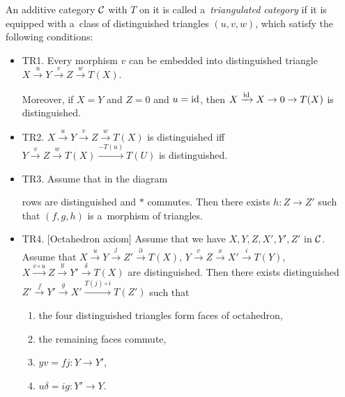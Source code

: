 	\begin{definition}
		An additive category $\mathcal{C}$ with $T$ on it is called
		a~{\em triangulated category} if it is equipped
		with a~class of distinguished triangles $(u,v,w)$,
		which satisfy the following conditions:
		\begin{itemize}
			\item TR1. Every morphism $v$ can be embedded into 
			distinguished triangle 
			$X \xrightarrow u Y \xrightarrow v Z \xrightarrow w T(X)$.
			
			Moreover, if $X=Y$ and $Z=0$ and $u={\mathrm{id}}$, then
			$X \xrightarrow{{\mathrm{id}}} X \to 0 \to T(X)$
			is distinguished.
			
			\item TR2. $X \xrightarrow u Y \xrightarrow v Z \xrightarrow w T(X)$
			is distinguished iff
			$Y \xrightarrow v Z \xrightarrow w T(X) \xrightarrow{-T(u)} T(U)$
			is distinguished.
			
			\item TR3. Assume that in the diagram
			
			rows are distinguished and $\ast$ commutes.
			Then there exists $h:Z \to Z'$ such that $(f,g,h)$
			is a~morphism of triangles.
			
			\item TR4. [Octahedron axiom]
			Assume that we have $X,Y,Z,X',Y',Z'$ in $\mathcal{C}$.
			Assume that 
			$X \xrightarrow u Y \xrightarrow j Z' \xrightarrow \partial T(X)$,
			$Y \xrightarrow v Z \xrightarrow x X' \xrightarrow i T(Y)$,
			$X \xrightarrow {v \circ u} Z \xrightarrow y Y' \xrightarrow \delta T(X)$
			are distinguished.
			Then there exists distinguished
			$Z' \xrightarrow f Y' \xrightarrow g X' \xrightarrow {T(j) \circ i} T(Z')$
			such that
			\begin{enumerate}
				\item the four distinguished triangles form faces of octahedron,
				\item the remaining faces commute,
				\item $yv = fj: Y \to Y'$,
				\item $u \delta = i g: Y' \to Y$.
			\end{enumerate}
			

\end{itemize}
\end{definition}
